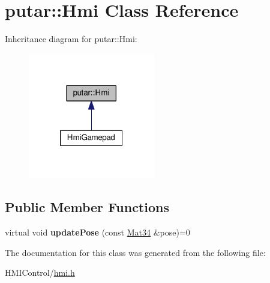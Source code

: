 \hypertarget{classputar_1_1Hmi}{}\section{putar\+:\+:Hmi Class Reference}
\label{classputar_1_1Hmi}


Inheritance diagram for putar\+:\+:Hmi\+:
\nopagebreak
\begin{figure}[H]
\begin{center}
\leavevmode
\includegraphics[width=157pt]{classputar_1_1Hmi__inherit__graph}
\end{center}
\end{figure}
\subsection*{Public Member Functions}
\begin{DoxyCompactItemize}
\item 
virtual void {\bfseries update\+Pose} (const \hyperlink{namespaceputar_a8bf3c8025ae8f60f553a752014c9849a}{Mat34} \&pose)=0\hypertarget{classputar_1_1Hmi_ab559867746b7c558c4b9370245d08ada}{}\label{classputar_1_1Hmi_ab559867746b7c558c4b9370245d08ada}

\end{DoxyCompactItemize}


The documentation for this class was generated from the following file\+:\begin{DoxyCompactItemize}
\item 
H\+M\+I\+Control/\hyperlink{hmi_8h}{hmi.\+h}\end{DoxyCompactItemize}
